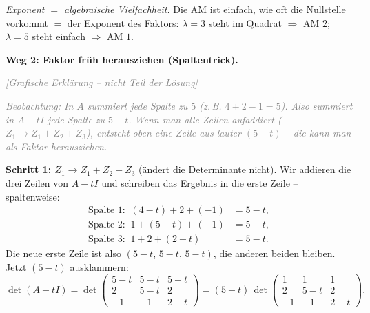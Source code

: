 \documentclass[a4paper,12pt]{article}
\newcommand{\grafik}{\textcolor{gray}{\small\textit{[Grafische Erkl\"arung -- nicht Teil der L\"osung]}}}
\begin{document}
\emph{Exponent $=$ algebraische Vielfachheit.} Die AM ist einfach, wie oft die Nullstelle vorkommt $=$ der Exponent des Faktors: $\lambda = 3$ steht im Quadrat $\Rightarrow$ AM $2$; $\lambda = 5$ steht einfach $\Rightarrow$ AM $1$.

\bigskip

\textbf{Weg 2: Faktor fr\"uh herausziehen (Spaltentrick).}

\grafik

\begin{center}
\end{center}

\textcolor{gray}{\small\textit{Beobachtung: In $A$ summiert jede Spalte zu $5$ (z.\,B. $4+2-1 = 5$). Also summiert in $A - tI$ jede Spalte zu $5 - t$. Wenn man alle Zeilen aufaddiert ($Z_1 \to Z_1 + Z_2 + Z_3$), entsteht oben eine Zeile aus lauter $(5-t)$ -- die kann man als Faktor herausziehen.}}

\textbf{Schritt 1: $Z_1 \to Z_1 + Z_2 + Z_3$} (\"andert die Determinante nicht). Wir addieren die drei Zeilen von $A - tI$ und schreiben das Ergebnis in die erste Zeile -- spaltenweise:
\begin{align*}
\text{Spalte 1:}\;\; (4-t) + 2 + (-1) &= 5 - t, \\
\text{Spalte 2:}\;\; 1 + (5-t) + (-1) &= 5 - t, \\
\text{Spalte 3:}\;\; 1 + 2 + (2-t) &= 5 - t.
\end{align*}
Die neue erste Zeile ist also $(5-t,\, 5-t,\, 5-t)$, die anderen beiden bleiben. Jetzt $(5-t)$ ausklammern:
\[
\det(A - tI) = \det\!\begin{pmatrix} 5-t & 5-t & 5-t \\ 2 & 5-t & 2 \\ -1 & -1 & 2-t \end{pmatrix}
= (5-t)\,\det\!\begin{pmatrix} 1 & 1 & 1 \\ 2 & 5-t & 2 \\ -1 & -1 & 2-t \end{pmatrix}.
\]
\end{document}
